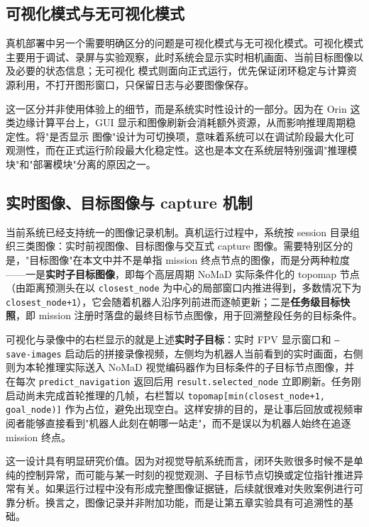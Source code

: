\subsection{可视化模式与无可视化模式}

真机部署中另一个需要明确区分的问题是可视化模式与无可视化模式。可视化模式主要用于调试、录屏与实验观察，此时系统会显示实时相机画面、当前目标图像以及必要的状态信息；无可视化
模式则面向正式运行，优先保证闭环稳定与计算资源利用，不打开图形窗口，只保留日志与必要图像保存。

这一区分并非使用体验上的细节，而是系统实时性设计的一部分。因为在 Orin 这类边缘计算平台上，GUI 显示和图像刷新会消耗额外资源，从而影响推理周期稳定性。将"是否显示
图像"设计为可切换项，意味着系统可以在调试阶段最大化可观测性，而在正式运行阶段最大化稳定性。这也是本文在系统层特别强调"推理模块"和"部署模块"分离的原因之一。

\subsection{实时图像、目标图像与 capture 机制}

当前系统已经支持统一的图像记录机制。真机运行过程中，系统按 session 目录组织三类图像：实时前视图像、目标图像与交互式 capture 图像。需要特别区分的是，"目标图像"在本文中并不是单指 mission 终点节点的图像，而是分两种粒度——一是\textbf{实时子目标图像}，即每个高层周期 NoMaD 实际条件化的 topomap 节点（由距离预测头在以 \texttt{closest\_node} 为中心的局部窗口内推进得到，多数情况下为 \texttt{closest\_node+1}），它会随着机器人沿序列前进而逐帧更新；二是\textbf{任务级目标快照}，即 mission 注册时落盘的最终目标节点图像，用于回溯整段任务的目标条件。

可视化与录像中的右栏显示的就是上述\textbf{实时子目标}：实时 FPV 显示窗口和 \texttt{--save-images} 启动后的拼接录像视频，左侧均为机器人当前看到的实时画面，右侧则为本轮推理实际送入 NoMaD 视觉编码器作为目标条件的子目标节点图像，并在每次 \texttt{predict\_navigation} 返回后用 \texttt{result.selected\_node} 立即刷新。任务刚启动尚未完成首轮推理的几帧，右栏暂以 \texttt{topomap[min(closest\_node+1, goal\_node)]} 作为占位，避免出现空白。这样安排的目的，是让事后回放或视频审阅者能够直接看到"机器人此刻在朝哪一站走"，而不是误以为机器人始终在追逐 mission 终点。

这一设计具有明显研究价值。因为对视觉导航系统而言，闭环失败很多时候不是单纯的控制异常，而可能与某一时刻的视觉观测、子目标节点切换或定位指针推进异常有关。如果运行过程中没有形成完整图像证据链，后续就很难对失败案例进行可靠分析。换言之，图像记录并非附加功能，而是让第五章实验具有可追溯性的基础。

